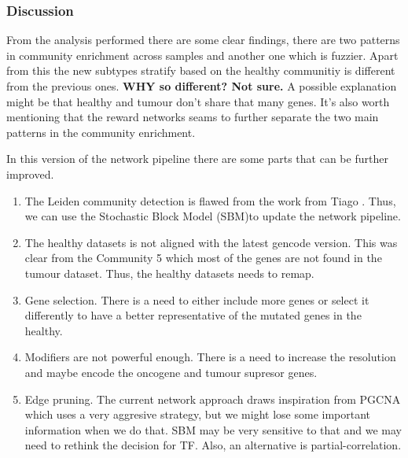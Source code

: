 \subsubsection{Discussion}
From the analysis performed there are some clear findings, there are two patterns in community enrichment across samples and another one which is fuzzier. Apart from this the new subtypes stratify based on the healthy communitiy is different from the previous ones. \textbf{WHY so different? Not sure.} A possible explanation might be that healthy and tumour don't share that many genes. It's also worth mentioning that the reward networks seams to further separate the two main patterns in the community enrichment.

In this version of the network pipeline there are some parts that can be further improved.
\begin{enumerate}
    \item The Leiden community detection is flawed from the work from Tiago \cite{Peixoto2021-jx,Fortunato2016-tj}. Thus, we can use the Stochastic Block Model (SBM)\cite{Peixoto2017-ua}to update the network pipeline.
    \item The healthy datasets is not aligned with the latest gencode version. This was clear from the Community 5 which most of the genes are not found in the tumour dataset. Thus, the healthy datasets needs to remap.
    \item Gene selection. There is a need to either include more genes or select it differently to have a better representative of the mutated genes in the healthy.
    \item Modifiers are not powerful enough. There is a need to increase the resolution and maybe encode the oncogene and tumour supresor genes.
    \item Edge pruning. The current network approach draws inspiration from PGCNA which uses a very aggresive strategy, but we might lose some important information when we do that. SBM may be very sensitive to that and we may need to rethink the decision for TF. Also, an alternative is partial-correlation.
\end{enumerate}



